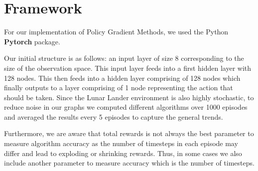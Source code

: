 \documentclass{article}
\begin{document}
\section{Framework}
For our implementation of Policy Gradient Methods, we used the Python \textbf{Pytorch} package. 
\par Our initial structure is as follows: an input layer of size 8 corresponding to the size of the observation space. This input layer feeds into a first hidden layer with 128 nodes. This then feeds into a hidden layer comprising of 128 nodes which finally outputs to a layer comprising of 1 node representing the action that should be taken. Since the Lunar Lander environment is also highly stochastic, to reduce noise in our graphs we computed different algorithms over 1000 episodes and averaged the results every 5 episodes to capture the general trends. 
\par Furthermore, we are aware that total rewards is not always the best parameter to measure algorithm accuracy as the number of timesteps in each episode may differ and lead to exploding or shrinking rewards. Thus, in some cases we also include another parameter to measure accuracy which is the number of timesteps.

\end{document}
